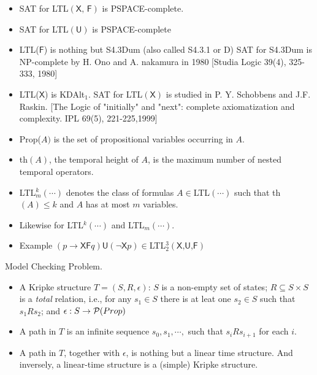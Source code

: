 \documentclass[12pt]{article}
\begin{document}
\begin{CJK*}{GBK}{song}
\begin{itemize}
\item SAT for LTL$(\textsf{X, F})$ is PSPACE-complete.

\item SAT for LTL$(\textsf{U})$ is PSPACE-complete

\item LTL($\textsf{F}$) is nothing but S4.3Dum (also called S4.3.1 or D)
SAT for S4.3Dum is NP-complete by H. Ono and A. nakamura in 1980 [Studia Logic 39(4), 325-333, 1980]

\item LTL($\textsf{X}$) is KDAlt$_1$. SAT for LTL$(\textsf{X})$ is studied in  P. Y. Schobbens and J.F. Raskin. [The Logic of "initially" and "next": complete axiomatization and complexity. IPL 69(5), 221-225,1999]
\end{itemize}

\begin{itemize}
\item Prop($A)$ is the set of propositional variables occurring in $A$.

\item th$(A)$, the temporal height of $A$, is the maximum number of nested temporal operators.

\item LTL$^k_m(\cdots)$ denotes the class of  formulas $A\in$LTL$(\cdots)$ such that th$(A)\leq k$ and $A$ has at most $m$ variables.
\item Likewise for LTL$^k(\cdots)$ and LTL$_m(\cdots)$.
\item Example $(p\rightarrow \textsf{XF}q)\textsf{U}(\neg\textsf{X}p)\in$LTL$_2^3(\textsf{X,U,F})$
\end{itemize}


Model Checking Problem.

\begin{itemize}
\item A Kripke structure $T=(S, R,\epsilon)$: $S$ is a non-empty set of states; $R\subseteq S\times S$ is a {\em total} relation, i.e., for any $s_1\in S$ there is at leat one $s_2\in S$ such that $s_1Rs_2$; and $\epsilon: S\rightarrow {\cal P}(Prop)$
\item A path in $T$ is an infinite sequence $s_0, s_1,\cdots,$ such that $s_iRs_{i+1}$ for each $i$.

\item A path in $T$, together with $\epsilon$, is nothing but a linear time structure. And inversely, a linear-time structure is a (simple) Kripke structure.


\end{itemize}
\end{CJK*}
\end{document}
